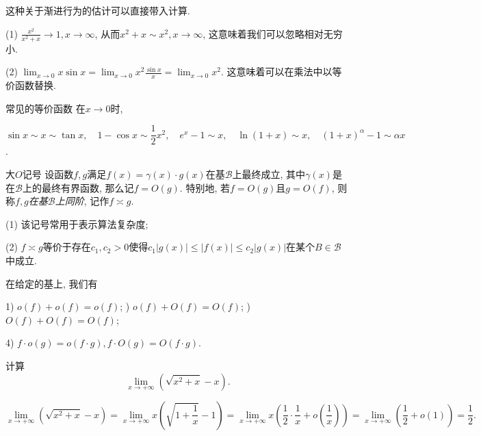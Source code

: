 这种关于渐进行为的估计可以直接带入计算. 

\begin{example}
	(1) $\frac{x^2}{x^2+x} \to 1, x \to \infty$, 从而$x^2+x \sim x^2, x \to \infty$, 这意味着我们可以忽略相对无穷小. 
	
	(2) $\lim_{x \to 0} x\sin x = \lim_{x \to 0} x^2 \frac{\sin x}{x} = \lim_{x \to 0} x^2$. 这意味着可以在乘法中以等价函数替换. 
\end{example}

\begin{proposition}{常见的等价函数}
	在$x \to 0$时, 
	
	\begin{center}
		$\sin x \sim x \sim \tan x, \quad 1-\cos x \sim \dfrac{1}{2}x^2,\quad e^x-1 \sim x,\quad \ln (1+x) \sim x,\quad (1+x)^{\alpha}-1 \sim \alpha x $.
	\end{center}
\end{proposition}

\begin{definition}{大$O$记号}
	设函数$f,g$满足$f(x) = \gamma (x) \cdot g(x)$在基$\mathcal{B}$上最终成立, 其中$\gamma (x)$是在$\mathcal{B}$上的最终有界函数, 那么记$f=O(g)$. 特别地, 若$f=O(g)$且$g=O(f)$, 则称$f,g$\textit{在基$\mathcal{B}$上同阶}, 记作$f \asymp g$. 
\end{definition}
\begin{remark}
	(1) 该记号常用于表示算法复杂度; 
	
	(2) $f \asymp g$等价于存在$c_1,c_2 >0$使得$c_1|g(x)| \leq |f(x)| \leq c_2|g(x)|$在某个$B \in \mathcal{B}$中成立. 
\end{remark}

\begin{proposition}{}
	在给定的基上, 我们有
	
	\begin{center}
		1) $o(f)+o(f)=o(f)$; ) $o(f)+O(f)=O(f)$; ) $O(f)+O(f)=O(f)$; 
	\end{center}
	
	\begin{center}
		4) $f \cdot o(g) = o(f \cdot g), f \cdot O(g) = O(f \cdot g)$.
	\end{center}
\end{proposition}

\begin{example}
	计算$$\lim_{x \to +\infty} (\sqrt{x^2+x}-x).$$
\end{example}
\begin{solution}
	$$\lim_{x \to +\infty} (\sqrt{x^2+x}-x) = \lim_{x \to +\infty} x(\sqrt{1+\frac{1}{x}}-1) = \lim_{x \to +\infty} x(\frac{1}{2} \cdot \frac{1}{x} + o(\frac{1}{x})) = \lim_{x \to +\infty} (\frac{1}{2} +o(1)) = \frac{1}{2}. $$
\end{solution}

